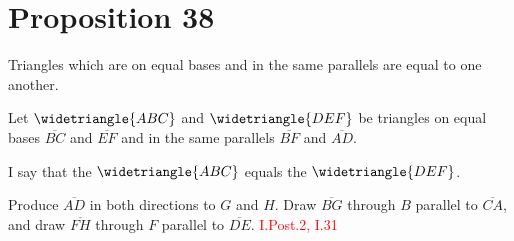 
\section*{Proposition 38}

\begin{thm}
Triangles which are on equal bases and in the same parallels are equal to one another.
\end{thm}

Let $\widetriangle{ABC}$ and $\widetriangle{DEF}$ be triangles on equal bases $\overline{BC}$ and $\overline{EF}$ and in the same parallels $\overline{BF}$ and $\overline{AD}$.

\begin{figure}[H]
	\caption{}
\end{figure}

I say that the $\widetriangle{ABC}$ equals the $\widetriangle{DEF}$.  

 Produce $\overline{AD}$ in both directions to $G$ and $H$. Draw $\overline{BG}$ through $B$ parallel to $\overline{CA}$, and draw $\overline{FH}$ through $F$ parallel to $\overline{DE}$. \hfill\textcolor{red}{I.Post.2, I.31}

\begin{figure}[H]
	\caption{}
\end{figure}

